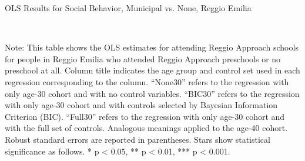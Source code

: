 \begin{table}[H] \caption{OLS Results for Social Behavior, Municipal vs. None, Reggio Emilia} \label{ols-S-reg}

\vspace{1ex} \\
\footnotesize\raggedright{Note: This table shows the OLS estimates for attending Reggio Approach schools for people in Reggio Emilia who attended Reggio Approach preschools or no preschool at all. Column title indicates the age group and control set used in each regression corresponding to the column. ``None30'' refers to the regression with only age-30 cohort and with no control variables. ``BIC30'' refers to the regression with only age-30 cohort and with controls selected by Bayesian Information Criterion (BIC). ``Full30'' refers to the regression with only age-30 cohort and with the full set of controls. Analogous meanings applied to the age-40 cohort. Robust standard errors are reported in parentheses. Stars show statistical significance as follows. * p < 0.05, ** p < 0.01, *** p < 0.001.}
\end{table}


